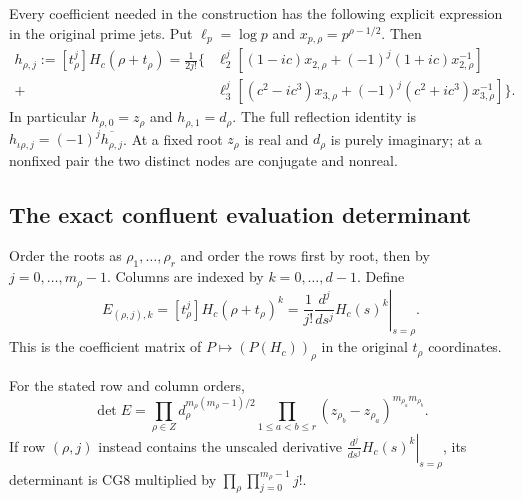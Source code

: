 Every coefficient needed in the construction has the following
explicit expression in the original prime jets. Put
$\ell_p=\log p$ and $x_{p,\rho}=p^{\rho-1/2}$. Then
\begin{equation}
\begin{split}
 h_{\rho,j}:=[t_\rho^j]H_c(\rho+t_\rho)
 =\frac1{2j!}\bigl\{
 &\ell_2^j[(1-ic)x_{2,\rho}
               +(-1)^j(1+ic)x_{2,\rho}^{-1}]\\
 +&\ell_3^j[(c^2-ic^3)x_{3,\rho}
               +(-1)^j(c^2+ic^3)x_{3,\rho}^{-1}]
 \bigr\}.
\end{split}
\tag{CG6}\label{cg:coefficients}
\end{equation}
In particular $h_{\rho,0}=z_\rho$ and $h_{\rho,1}=d_\rho$.
The full reflection identity is
$h_{\iota\rho,j}=(-1)^j\overline{h_{\rho,j}}$.
At a fixed root $z_\rho$ is real and $d_\rho$ is purely imaginary;
at a nonfixed pair the two distinct nodes are conjugate and nonreal.

\subsection{The exact confluent evaluation determinant}

Order the roots as $\rho_1,\ldots,\rho_r$ and order the rows first
by root, then by $j=0,\ldots,m_\rho-1$. Columns are indexed by
$k=0,\ldots,d-1$. Define
\begin{equation}
 E_{(\rho,j),k}=[t_\rho^j]H_c(\rho+t_\rho)^k
       =\frac1{j!}\left.\frac{d^j}{ds^j}H_c(s)^k\right|_{s=\rho}.
 \tag{CG7}\label{cg:evaluation}
\end{equation}
This is the coefficient matrix of
$P\mapsto(P(H_c))_\rho$ in the original $t_\rho$ coordinates.

\begin{theorem}
\label{cg:det-thm}
For the stated row and column orders,
\begin{equation}
 \det E=
 \prod_{\rho\in Z}d_\rho^{m_\rho(m_\rho-1)/2}
 \prod_{1\le a<b\le r}
          (z_{\rho_b}-z_{\rho_a})^{m_{\rho_a}m_{\rho_b}}.
 \tag{CG8}\label{cg:det}
\end{equation}
If row $(\rho,j)$ instead contains the unscaled derivative
$\left.\frac{d^j}{ds^j}H_c(s)^k\right|_{s=\rho}$, its determinant
is CG8 multiplied by
$\prod_\rho\prod_{j=0}^{m_\rho-1}j!$.
\end{theorem}

